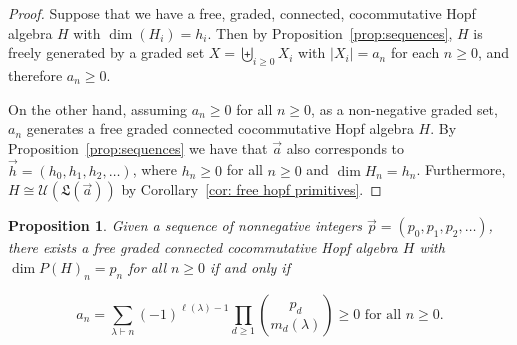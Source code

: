 \documentclass[11pt]{amsart}
\newtheorem{proposition}[theorem]{Proposition}
\theoremstyle{definition}
\numberwithin{equation}{section}
\begin{document}
\begin{proof}

Suppose that we have a free, graded, connected, cocommutative Hopf algebra $H$ with $\dim(H_{i}) = h_{i}$.  Then by Proposition~\ref{prop:sequences}, $H$ is freely generated by a graded set $X = \biguplus_{i \ge 0} X_{i}$ with $|X_{i}| = a_{n}$ for each $n \ge 0$, and therefore $a_{n} \ge 0$.

On the other hand, assuming \(a_n \geq 0\) for all \(n \geq 0\), as a non-negative graded set, \(a_n\) generates a free graded connected cocommutative Hopf algebra \(H\). By Proposition~\ref{prop:sequences}  we have that  \(\vec{a}\) also corresponds to 
\(\vec{h} = (h_0, h_1, h_2, \ldots)\), where \(h_n \geq 0\) for all \(n \geq 0\) and \(\dim{H_n} = h_n\). 
Furthermore, \(H \cong \mathcal{U}(\mathfrak{L}(\vec{a}))\) by Corollary~\ref{cor: free hopf primitives}.
%
\end{proof}

\begin{proposition}
\label{prop:UniqueBySequence}
	Given a sequence of nonnegative integers $\vec{p} = (p_0, p_1, p_2, \ldots)$, there exists a free graded connected cocommutative Hopf algebra $H$ with $\dim P(H)_n = p_n$ for all $n \geq 0$ if and only if 
	
	$$a_n = \sum_{\lambda \vdash n} (-1)^{\ell(\lambda)-1} \prod_{d \geq 1} \binom{p_d}{m_d(\lambda)} \geq 0 \text{ for all } n\geq 0.$$ 
\end{proposition}
\end{document}

